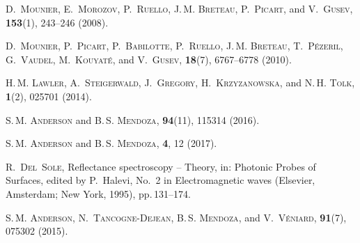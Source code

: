 \documentclass[pss]{wiley2sp} %
\begin{document}
\begin{thebibliography}{[10]}
 \textsc{D.~Mounier},  \textsc{E.~Morozov},  \textsc{P.~Ruello},
  \textsc{J.\,M. Breteau},  \textsc{P.~Picart},  and  \textsc{V.~Gusev},
  \textbf{153}(1), 243--246 (2008).


 \textsc{D.~Mounier},  \textsc{P.~Picart},  \textsc{P.~Babilotte},
  \textsc{P.~Ruello},  \textsc{J.\,M. Breteau},  \textsc{T.~P{\'e}zeril},
  \textsc{G.~Vaudel},  \textsc{M.~Kouyat{\'e}},  and  \textsc{V.~Gusev},
  \textbf{18}(7), 6767--6778 (2010).


 \textsc{H.\,M. Lawler},  \textsc{A.~Steigerwald},  \textsc{J.~Gregory},
  \textsc{H.~Krzyzanowska},  and  \textsc{N.\,H. Tolk},
  \textbf{1}(2), 025701 (2014).


 \textsc{S.\,M. Anderson} and  \textsc{B.\,S. Mendoza},
  \textbf{94}(11), 115314 (2016).


 \textsc{S.\,M. Anderson} and  \textsc{B.\,S. Mendoza},
  \textbf{4}, 12 (2017).


\othercit
{}%
 \textsc{R.~Del~Sole},
Reflectance spectroscopy -- {T}heory,
 in: Photonic Probes of Surfaces, edited by P.~Halevi, No.~2 in Electromagnetic
  waves (Elsevier, Amsterdam; New York, 1995),  pp.\,131--174.


 \textsc{S.\,M. Anderson},  \textsc{N.~Tancogne-Dejean},  \textsc{B.\,S.
  Mendoza},  and  \textsc{V.~V{\'e}niard},
  \textbf{91}(7), 075302 (2015).



\end{thebibliography}
\end{document}
